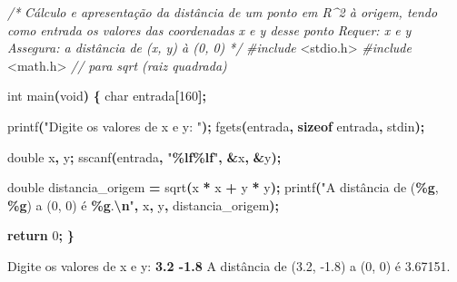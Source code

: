 \documentclass[
  11pt,
  a4paper,
]{scrbook}
\newenvironment{Shaded}{\begin{snugshade}}{\end{snugshade}}
\newcommand{\CommentTok}[1]{\textcolor[rgb]{0.56,0.35,0.01}{\textit{#1}}}
\newcommand{\ControlFlowTok}[1]{\textcolor[rgb]{0.13,0.29,0.53}{\textbf{#1}}}
\newcommand{\DataTypeTok}[1]{\textcolor[rgb]{0.13,0.29,0.53}{#1}}
\newcommand{\DecValTok}[1]{\textcolor[rgb]{0.00,0.00,0.81}{#1}}
\newcommand{\ImportTok}[1]{#1}
\newcommand{\KeywordTok}[1]{\textcolor[rgb]{0.13,0.29,0.53}{\textbf{#1}}}
\newcommand{\NormalTok}[1]{#1}
\newcommand{\OperatorTok}[1]{\textcolor[rgb]{0.81,0.36,0.00}{\textbf{#1}}}
\newcommand{\PreprocessorTok}[1]{\textcolor[rgb]{0.56,0.35,0.01}{\textit{#1}}}
\newcommand{\SpecialCharTok}[1]{\textcolor[rgb]{0.81,0.36,0.00}{\textbf{#1}}}
\newcommand{\StringTok}[1]{\textcolor[rgb]{0.31,0.60,0.02}{#1}}
\begin{document}
\begin{Shaded}
\begin{Highlighting}[]
\CommentTok{/*}
\CommentTok{Cálculo e apresentação da distância de um ponto em R\^{}2 à origem, tendo como}
\CommentTok{    entrada os valores das coordenadas x e y desse ponto}
\CommentTok{Requer: x e y}
\CommentTok{Assegura: a distância de (x, y) à (0, 0)}
\CommentTok{*/}
\PreprocessorTok{\#include }\ImportTok{\textless{}stdio.h\textgreater{}}
\PreprocessorTok{\#include }\ImportTok{\textless{}math.h\textgreater{}}\PreprocessorTok{  }\CommentTok{// para sqrt (raiz quadrada)}

\DataTypeTok{int}\NormalTok{ main}\OperatorTok{(}\DataTypeTok{void}\OperatorTok{)} \OperatorTok{\{}
    \DataTypeTok{char}\NormalTok{ entrada}\OperatorTok{[}\DecValTok{160}\OperatorTok{];}

\NormalTok{    printf}\OperatorTok{(}\StringTok{"Digite os valores de x e y: "}\OperatorTok{);}
\NormalTok{    fgets}\OperatorTok{(}\NormalTok{entrada}\OperatorTok{,} \KeywordTok{sizeof}\NormalTok{ entrada}\OperatorTok{,}\NormalTok{ stdin}\OperatorTok{);}

    \DataTypeTok{double}\NormalTok{ x}\OperatorTok{,}\NormalTok{ y}\OperatorTok{;}
\NormalTok{    sscanf}\OperatorTok{(}\NormalTok{entrada}\OperatorTok{,} \StringTok{"}\SpecialCharTok{\%lf\%lf}\StringTok{"}\OperatorTok{,} \OperatorTok{\&}\NormalTok{x}\OperatorTok{,} \OperatorTok{\&}\NormalTok{y}\OperatorTok{);}

    \DataTypeTok{double}\NormalTok{ distancia\_origem }\OperatorTok{=}\NormalTok{ sqrt}\OperatorTok{(}\NormalTok{x }\OperatorTok{*}\NormalTok{ x }\OperatorTok{+}\NormalTok{ y }\OperatorTok{*}\NormalTok{ y}\OperatorTok{);}
\NormalTok{    printf}\OperatorTok{(}\StringTok{"A distância de (}\SpecialCharTok{\%g}\StringTok{, }\SpecialCharTok{\%g}\StringTok{) a (0, 0) é }\SpecialCharTok{\%g}\StringTok{.}\SpecialCharTok{\textbackslash{}n}\StringTok{"}\OperatorTok{,}\NormalTok{ x}\OperatorTok{,}\NormalTok{ y}\OperatorTok{,}\NormalTok{ distancia\_origem}\OperatorTok{);}

    \ControlFlowTok{return} \DecValTok{0}\OperatorTok{;}
\OperatorTok{\}}
\end{Highlighting}
\end{Shaded}

\begin{Shaded}
\begin{Highlighting}[]
\NormalTok{Digite os valores de x e y: }\KeywordTok{ 3.2 {-}1.8 }
\NormalTok{A distância de (3.2, {-}1.8) a (0, 0) é 3.67151.}
\end{Highlighting}
\end{Shaded}
\end{document}

